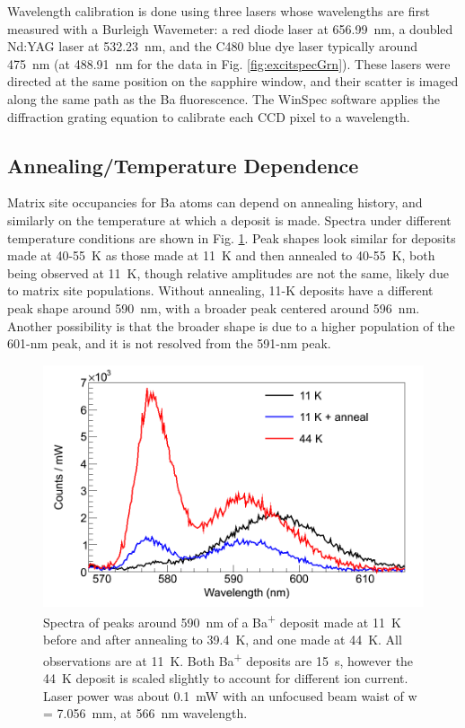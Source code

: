 Wavelength calibration is done using three lasers whose wavelengths are first measured with a Burleigh Wavemeter:  a red diode laser at 656.99~nm, a doubled Nd:YAG laser at 532.23~nm, and the C480 blue dye laser typically around 475~nm (at 488.91~nm for the data in Fig. \ref{fig:excitspecGrn}).  These lasers were directed at the same position on the sapphire window, and their scatter is imaged along the same path as the Ba fluorescence.  The WinSpec software applies the diffraction grating equation to calibrate each CCD pixel to a wavelength.

\subsection{Annealing/Temperature Dependence}
\label{subsec:tempanneal}


Matrix site occupancies for Ba atoms can depend on annealing history, and similarly on the temperature at which a deposit is made.  Spectra under different temperature conditions are shown in Fig. \ref{fig:specTempConditions}.  Peak shapes look similar for deposits made at 40-55~K as those made at 11~K and then annealed to 40-55~K, both being observed at 11~K, though relative amplitudes are not the same, likely due to matrix site populations.  Without annealing, 11-K deposits have a different peak shape around 590~nm, with a broader peak centered around 596~nm.  Another possibility is that the broader shape is due to a higher population of the 601-nm peak, and it is not resolved from the 591-nm peak.

\begin{figure} %
        \centering
                \includegraphics[width=.7\textwidth]{figures/spectra_temperature_conditions.png}
                \caption{Spectra of peaks around 590~nm of a Ba\textsuperscript{+} deposit made at 11~K before and after annealing to 39.4~K, and one made at 44~K.  All observations are at 11~K.  Both Ba\textsuperscript{+} deposits are 15~s, however the 44~K deposit is scaled slightly to account for different ion current.  Laser power was about 0.1~mW with an unfocused beam waist of w = 7.056~mm, at 566~nm wavelength.}
\label{fig:specTempConditions}
\end{figure}

